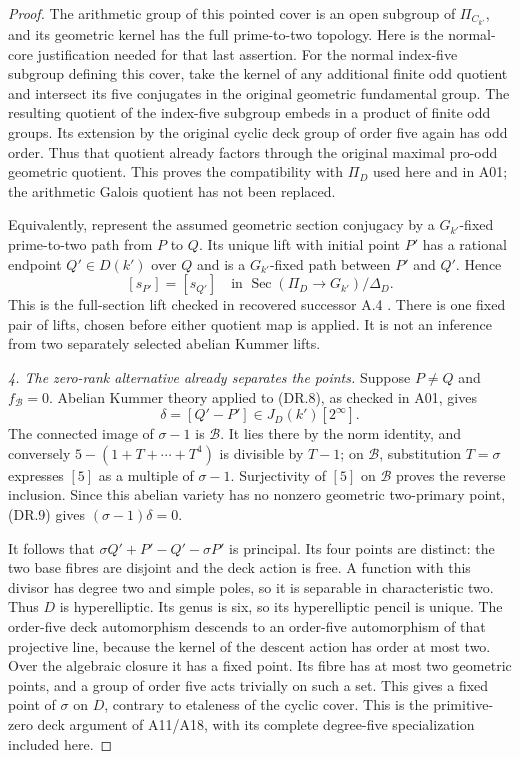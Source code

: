 \documentclass[11pt,a4paper]{article}
\begin{document}
\begin{proof}
The arithmetic group of this pointed cover is an open subgroup of
$\Pi_{C_{k'}}$, and its geometric kernel has the full prime-to-two
topology.  Here is the normal-core justification needed for that
last assertion.  For the normal index-five subgroup defining this
cover, take the kernel of any additional finite odd quotient and
intersect its five conjugates in the original geometric fundamental
group.  The resulting quotient of the index-five subgroup embeds in
a product of finite odd groups.  Its extension by the original cyclic
deck group of order five again has odd order.  Thus that quotient
already factors through the original maximal pro-odd geometric
quotient.  This proves the compatibility with $\Pi_D$ used here and
in A01; the arithmetic Galois quotient has not been replaced.

Equivalently, represent the assumed geometric section conjugacy by a
$G_{k'}$-fixed prime-to-two path from $P$ to $Q$.  Its unique lift with
initial point $P'$ has a rational endpoint $Q'\in D(k')$ over $Q$ and
is a $G_{k'}$-fixed path between $P'$ and $Q'$.  Hence
\[
             [s_{P'}]=[s_{Q'}]
             \quad\text{in }\operatorname{Sec}(\Pi_D\to G_{k'})/\Delta_D.
 \tag{DR.8}
\]
This is the full-section lift checked in recovered successor A.4
\cite[A.4]{ASrun}.  There is one fixed pair of lifts, chosen before
either quotient map is applied.  It is not an inference from two
separately selected abelian Kummer lifts.

\emph{4. The zero-rank alternative already separates the points.}
Suppose $P\ne Q$ and $f_{\mathcal B}=0$.  Abelian Kummer theory applied
to (DR.8), as checked in A01, gives
\[
                     \delta=[Q'-P']\in J_D(k')[2^\infty].
 \tag{DR.9}
\]
The connected image of $\sigma-1$ is $\mathcal B$.  It lies there by
the norm identity, and conversely $5-(1+T+\cdots+T^4)$ is divisible
by $T-1$; on $\mathcal B$, substitution $T=\sigma$ expresses $[5]$
as a multiple of $\sigma-1$.  Surjectivity of $[5]$ on
$\mathcal B$ proves the reverse inclusion.  Since this abelian variety
has no nonzero geometric two-primary point, (DR.9) gives
$(\sigma-1)\delta=0$.

It follows that $\sigma Q'+P'-Q'-\sigma P'$ is principal.  Its four
points are distinct: the two base fibres are disjoint and the deck
action is free.  A function with this divisor has degree two and
simple poles, so it is separable in characteristic two.  Thus $D$ is
hyperelliptic.  Its genus is six, so its hyperelliptic pencil is unique.
The order-five deck automorphism descends to an order-five
automorphism of that projective line, because the kernel of the
descent action has order at most two.  Over the algebraic closure it
has a fixed point.  Its fibre has at most two geometric points, and a
group of order five acts trivially on such a set.  This gives a fixed
point of $\sigma$ on $D$, contrary to etaleness of the cyclic cover.
This is the primitive-zero deck argument of A11/A18, with its complete
degree-five specialization included here.


\end{proof}
\end{document}
